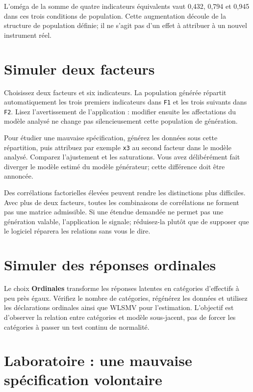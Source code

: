 \documentclass[
  french,
  11pt,
  a4paper,
  DIV=11,
  numbers=noendperiod]{scrreprt}
\begin{document}
L'oméga de la somme de quatre indicateurs équivalents vaut 0,432, 0,794
et 0,945 dans ces trois conditions de population. Cette augmentation
découle de la structure de population définie; il ne s'agit pas d'un
effet à attribuer à un nouvel instrument réel.

\section{Simuler deux facteurs}\label{simuler-deux-facteurs}

Choisissez deux facteurs et six indicateurs. La population générée
répartit automatiquement les trois premiers indicateurs dans \texttt{F1}
et les trois suivants dans \texttt{F2}. Lisez l'avertissement de
l'application : modifier ensuite les affectations du modèle analysé ne
change pas silencieusement cette population de génération.

Pour étudier une mauvaise spécification, générez les données sous cette
répartition, puis attribuez par exemple \texttt{x3} au second facteur
dans le modèle analysé. Comparez l'ajustement et les saturations. Vous
avez délibérément fait diverger le modèle estimé du modèle générateur;
cette différence doit être annoncée.

Des corrélations factorielles élevées peuvent rendre les distinctions
plus difficiles. Avec plus de deux facteurs, toutes les combinaisons de
corrélations ne forment pas une matrice admissible. Si une étendue
demandée ne permet pas une génération valable, l'application le signale;
réduisez-la plutôt que de supposer que le logiciel réparera les
relations sans vous le dire.

\section{Simuler des réponses
ordinales}\label{simuler-des-ruxe9ponses-ordinales}

Le choix \textbf{Ordinales} transforme les réponses latentes en
catégories d'effectifs à peu près égaux. Vérifiez le nombre de
catégories, régénérez les données et utilisez les déclarations ordinales
ainsi que WLSMV pour l'estimation. L'objectif est d'observer la relation
entre catégories et modèle sous-jacent, pas de forcer les catégories à
passer un test continu de normalité.

\section{Laboratoire : une mauvaise spécification
volontaire}\label{laboratoire-une-mauvaise-spuxe9cification-volontaire}
\end{document}
